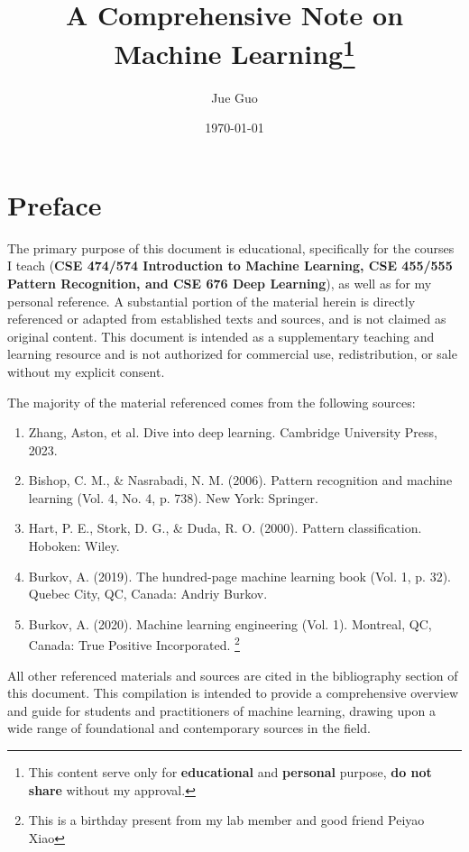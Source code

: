 \documentclass[12pt]{book}
\title{A Comprehensive Note on Machine Learning\footnote{This content serve only for \textbf{educational} and \textbf{personal} purpose, \textbf{do not share} without my approval.}}
\author{Jue Guo}
\date{\today}
\begin{document}
\frontmatter
\maketitle
\tableofcontents
\chapter*{Preface}

The primary purpose of this document is educational, specifically for the courses I teach (\textbf{CSE 474/574 Introduction to Machine Learning, CSE 455/555 Pattern Recognition, and CSE 676 Deep Learning}), as well as for my personal reference. A substantial portion of the material herein is directly referenced or adapted from established texts and sources, and is not claimed as original content. This document is intended as a supplementary teaching and learning resource and is not authorized for commercial use, redistribution, or sale without my explicit consent.

The majority of the material referenced comes from the following sources:

{
\renewcommand{\labelenumi}{[\theenumi]}
\setcounter{enumi}{0} %

\begin{enumerate}
	\item Zhang, Aston, et al. Dive into deep learning. Cambridge University Press, 2023.
	\item Bishop, C. M., \& Nasrabadi, N. M. (2006). Pattern recognition and machine learning (Vol. 4, No. 4, p. 738). New York: Springer.
	\item Hart, P. E., Stork, D. G., \& Duda, R. O. (2000). Pattern classification. Hoboken: Wiley.
	\item Burkov, A. (2019). The hundred-page machine learning book (Vol. 1, p. 32). Quebec City, QC, Canada: Andriy Burkov.
	\item Burkov, A. (2020). Machine learning engineering (Vol. 1). Montreal, QC, Canada: True Positive Incorporated. \footnote{This is a birthday present from my lab member and good friend Peiyao Xiao}
\end{enumerate}
}

All other referenced materials and sources are cited in the bibliography section of this document. This compilation is intended to provide a comprehensive overview and guide for students and practitioners of machine learning, drawing upon a wide range of foundational and contemporary sources in the field.
\end{document}
